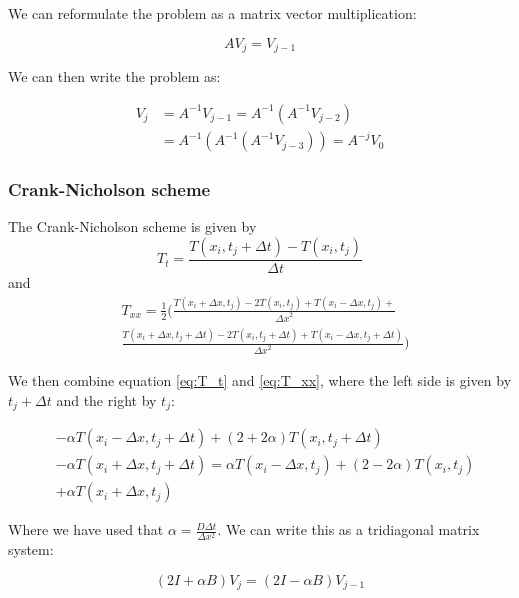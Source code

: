 \documentclass{article}
\begin{document}
\begin{multicols}{2}
We can reformulate the problem as a matrix vector multiplication:

\begin{equation}
A V_j=V_{j-1}
\end{equation}

We can then write the problem as:

\begin{equation}
\begin{split}
V_j &= A^{-1}V_{j-1}=A^{-1}(A^{-1}V_{j-2})\\
&=A^{-1}(A^{-1}(A^{-1}V_{j-3}))=A^{-j}V_0
\end{split}
\end{equation}

\subsubsection{Crank-Nicholson scheme}

The Crank-Nicholson scheme is given by
\begin{equation}
T_t = \frac{T(x_i,t_j+\Delta t)-T(x_i,t_j)}{\Delta t}
\label{eq:T_t}
\end{equation}
and 
\begin{equation}
\begin{split}
&T_{xx}=\frac{1}{2}\bigg( \frac{T(x_i+\Delta x, t_j)-2T(x_i,t_j)+T(x_i-\Delta x, t_j)+}{{\Delta x}^2} \\
&\frac{T(x_i + \Delta x, t_j + \Delta t )-2T(x_i,t_j+\Delta t)+T(x_i -\Delta x, t_j + \Delta t)}{{\Delta x}^2}\bigg)
\label{eq:T_xx}
\end{split}
\end{equation}

We then combine equation \ref{eq:T_t} and \ref{eq:T_xx}, where the left side is given by $t_j+\Delta t$ and the right by $t_j$:

\begin{equation}
\begin{split}
&-\alpha T(x_i-\Delta x, t_j+\Delta t)+(2+2\alpha) T(x_i, t_j+\Delta t)\\
&-\alpha T(x_i+\Delta x,t_j+\Delta t)=\alpha T(x_i-\Delta x, t_j)+(2-2\alpha)T(x_i,t_j)\\
&+\alpha T(x_i+\Delta x, t_j)
\end{split}
\end{equation}

Where we have used that $\alpha = \frac{D\Delta t}{\Delta x^2}$. We can write this as a tridiagonal matrix system:

\begin{equation}
(2I+\alpha B)V_j=(2I-\alpha B)V_{j-1}
\label{eq:IB}
\end{equation}


\end{multicols}
\end{document}
